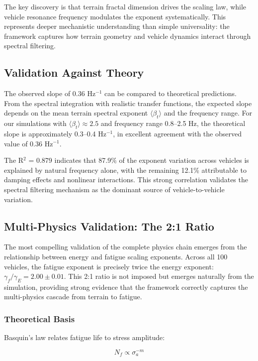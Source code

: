 \documentclass[11pt]{article}
\begin{document}
The key discovery is that terrain fractal dimension drives the scaling law, while vehicle resonance frequency modulates the exponent systematically. This represents deeper mechanistic understanding than simple universality: the framework captures how terrain geometry and vehicle dynamics interact through spectral filtering.

\subsection{Validation Against Theory}

The observed slope of 0.36 Hz$^{-1}$ can be compared to theoretical predictions. From the spectral integration with realistic transfer functions, the expected slope depends on the mean terrain spectral exponent $\langle \beta_t \rangle$ and the frequency range. For our simulations with $\langle \beta_t \rangle \approx 2.5$ and frequency range 0.8--2.5 Hz, the theoretical slope is approximately 0.3--0.4 Hz$^{-1}$, in excellent agreement with the observed value of 0.36 Hz$^{-1}$.

The R$^2$ = 0.879 indicates that 87.9\% of the exponent variation across vehicles is explained by natural frequency alone, with the remaining 12.1\% attributable to damping effects and nonlinear interactions. This strong correlation validates the spectral filtering mechanism as the dominant source of vehicle-to-vehicle variation.

\subsection{Multi-Physics Validation: The 2:1 Ratio}

The most compelling validation of the complete physics chain emerges from the relationship between energy and fatigue scaling exponents. Across all 100 vehicles, the fatigue exponent is precisely twice the energy exponent: $\gamma_f / \gamma_E = 2.00 \pm 0.01$. This 2:1 ratio is not imposed but emerges naturally from the simulation, providing strong evidence that the framework correctly captures the multi-physics cascade from terrain to fatigue.

\subsubsection{Theoretical Basis}

Basquin's law relates fatigue life to stress amplitude:

\begin{equation}
N_f \propto \sigma_a^{-m}
\end{equation}
\end{document}
